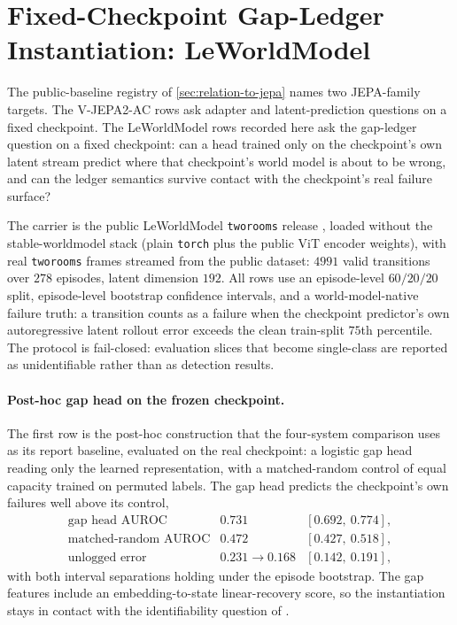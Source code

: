 \section{Fixed-Checkpoint Gap-Ledger Instantiation: LeWorldModel}
\label{sec:lewm-instantiation}

The public-baseline registry of \autoref{sec:relation-to-jepa} names two
JEPA-family targets.  The V-JEPA2-AC rows ask adapter and latent-prediction
questions on a fixed checkpoint.  The LeWorldModel rows recorded here ask the
gap-ledger question on a fixed checkpoint: can a head trained only on the
checkpoint's own latent stream predict where that checkpoint's world model is
about to be wrong, and can the ledger semantics survive contact with the
checkpoint's real failure surface?

The carrier is the public LeWorldModel \texttt{tworooms} release
\cite{leworldmodel}, loaded without the stable-worldmodel stack (plain
\texttt{torch} plus the public ViT encoder weights), with real
\texttt{tworooms} frames streamed from the public dataset: $4991$ valid
transitions over $278$ episodes, latent dimension $192$.  All rows use an
episode-level $60/20/20$ split, episode-level bootstrap confidence intervals,
and a world-model-native failure truth: a transition counts as a failure when
the checkpoint predictor's own autoregressive latent rollout error exceeds
the clean train-split $75$th percentile.  The protocol is fail-closed:
evaluation slices that become single-class are reported as unidentifiable
rather than as detection results.

\paragraph{Post-hoc gap head on the frozen checkpoint.}
The first row is the post-hoc construction that the four-system comparison
uses as its report baseline, evaluated on the real checkpoint: a logistic gap
head reading only the learned representation, with a matched-random control
of equal capacity trained on permuted labels.  The gap head predicts the
checkpoint's own failures well above its control,
$$
\begin{array}{lll}
\text{gap head AUROC} & 0.731 & [0.692,\ 0.774],\\
\text{matched-random AUROC} & 0.472 & [0.427,\ 0.518],\\
\text{unlogged error} & 0.231 \rightarrow 0.168 & [0.142,\ 0.191],
\end{array}
$$
with both interval separations holding under the episode bootstrap.  The gap
features include an embedding-to-state linear-recovery score, so the
instantiation stays in contact with the identifiability question of
\cite{lejepa-world-model}.

